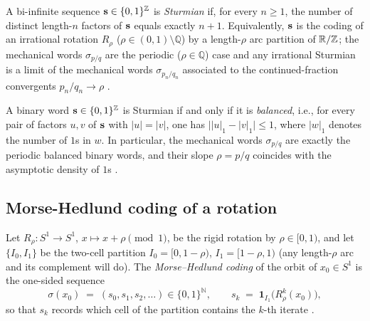 \begin{definition}\label{def:supp:sturmian-inf}
A bi-infinite sequence $\mathbf{s}\in\{0,1\}^{\mathbb{Z}}$ is \emph{Sturmian} if, for every $n\ge 1$, the number of distinct length-$n$ factors of $\mathbf{s}$ equals exactly $n+1$. Equivalently, $\mathbf{s}$ is the coding of an irrational rotation $R_\rho$ ($\rho\in(0,1)\setminus\mathbb{Q}$) by a length-$\rho$ arc partition of $\mathbb{R}/\mathbb{Z}$; the mechanical words $\sigma_{p/q}$ are the periodic ($\rho\in\mathbb{Q}$) case and any irrational Sturmian is a limit of the mechanical words $\sigma_{p_n/q_n}$ associated to the continued-fraction convergents $p_n/q_n\to\rho$ \citep{morse1940symbolic,lothaire2002algebraic}.
\end{definition}

\begin{theorem}[Sturmian = balanced binary]\label{thm:supp:sturmian-balanced}
A binary word $\mathbf{s}\in\{0,1\}^{\mathbb{Z}}$ is Sturmian if and only if it is \emph{balanced}, i.e., for every pair of factors $u,v$ of $\mathbf{s}$ with $|u|=|v|$, one has $\bigl||u|_1-|v|_1\bigr|\le 1$, where $|w|_1$ denotes the number of $1$s in $w$. In particular, the mechanical words $\sigma_{p/q}$ are exactly the periodic balanced binary words, and their slope $\rho=p/q$ coincides with the asymptotic density of $1$s \citep{coven1973sequences,lothaire2002algebraic}.
\end{theorem}

\subsection{Morse-Hedlund coding of a rotation}\label{sec:supp:morse-hedlund}

\begin{definition}\label{def:supp:morse-hedlund-coding}
Let $R_\rho:S^1\to S^1$, $x\mapsto x+\rho\pmod 1$, be the rigid rotation by $\rho\in[0,1)$, and let $\{I_0,I_1\}$ be the two-cell partition $I_0=[0,1-\rho)$, $I_1=[1-\rho,1)$ (any length-$\rho$ arc and its complement will do). The \emph{Morse--Hedlund coding} of the orbit of $x_0\in S^1$ is the one-sided sequence
\[
\sigma(x_0)\;=\;(s_0,s_1,s_2,\ldots)\in\{0,1\}^{\mathbb{N}},\qquad s_k\;=\;\mathbf{1}_{I_1}\!\bigl(R_\rho^{k}(x_0)\bigr),
\]
so that $s_k$ records which cell of the partition contains the $k$-th iterate \citep{morse1940symbolic,lothaire2002algebraic}.
\end{definition}

